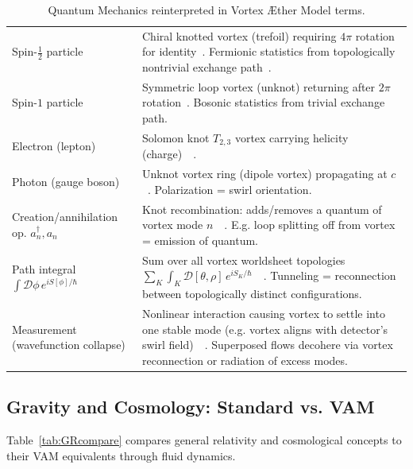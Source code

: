 \documentclass[preprint]{revtex4-2}
\begin{document}
\begin{table}[H]
\begin{tabular}{p{} | p{}}
            Spin-$\frac{1}{2}$ particle & Chiral knotted vortex (trefoil) requiring $4\pi$ rotation for identity~\cite{reference_190}. Fermionic statistics from topologically nontrivial exchange path~\cite{reference_191}. \\
            Spin-$1$ particle & Symmetric loop vortex (unknot) returning after $2\pi$ rotation~\cite{reference_192}. Bosonic statistics from trivial exchange path. \\
            Electron (lepton) & Solomon knot $T_{2,3}$ vortex carrying helicity (charge)~\cite{reference_193}~\cite{reference_194}. \\
            Photon (gauge boson) & Unknot vortex ring (dipole vortex) propagating at $c$~\cite{reference_195}. Polarization = swirl orientation. \\
            Creation/annihilation op. $a_n^\dagger, a_n$ & Knot recombination: adds/removes a quantum of vortex mode $n$~\cite{reference_196}~\cite{reference_197}. E.g. loop splitting off from vortex = emission of quantum. \\
            Path integral $\int \mathcal{D}\phi\,e^{iS[\phi]/\hbar}$ & Sum over all vortex worldsheet topologies $\sum_K \int_{K}\mathcal{D}[\theta,\rho]\,e^{iS_K/\hbar}$~\cite{reference_198}~\cite{reference_199}. Tunneling = reconnection between topologically distinct configurations. \\
            Measurement (wavefunction collapse) & Nonlinear interaction causing vortex to settle into one stable mode (e.g. vortex aligns with detector’s swirl field)~\cite{reference_200}~\cite{reference_201}. Superposed flows decohere via vortex reconnection or radiation of excess modes. \\
            \hline
        \end{tabular}
        \caption{Quantum Mechanics reinterpreted in Vortex Æther Model terms.}
        \label{tab:QMcompare}
    \end{table}

    \newpage

    \subsection{Gravity and Cosmology: Standard vs. VAM}
    Table~\ref{tab:GRcompare} compares general relativity and cosmological concepts to their VAM equivalents through fluid dynamics.
\end{document}

